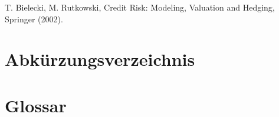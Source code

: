 \documentclass[oneside,bibliography=totocnumbered,BCOR=5mm]{scrbook}%
\theoremstyle{definition}
\theoremstyle{definition}
\theoremstyle{definition}
\theoremstyle{definition}
\theoremstyle{definition}
\theoremstyle{definition}
\begin{document}
%
%







% 
%  

\begin{thebibliography}{XX}
T. Bielecki, M. Rutkowski, Credit Risk: Modeling, Valuation and Hedging, Springer (2002).

\end{thebibliography}

\printbibliography[
heading=bibintoc,
title={Quellenverzeichnis}
]


\newpage

\chapter{Abkürzungsverzeichnis}
\newpage
\chapter{Glossar}
\end{document}
